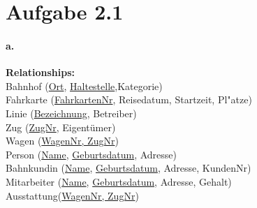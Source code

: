 \documentclass[12pt]{article}
\begin{document}
 	
 	
 	
 	
 	\section*{Aufgabe 2.1}
 	
 	
 	
 	\paragraph*{a.}
 		\textbf{Relationships:}\\
 		
	 	Bahnhof (\underline{Ort}, \underline{Haltestelle},Kategorie)\\[1.3em]
	 	
	 	Fahrkarte (\underline{FahrkartenNr}, Reisedatum, Startzeit, Pl"atze)\\[1.3em]
	 	
	 	Linie (\underline{Bezeichnung}, Betreiber)\\[1.3em]
	 	
	 	Zug (\underline{ZugNr}, Eigentümer)\\[1.3em]
	 	
	 	Wagen (\underline{WagenNr, ZugNr})\\[1.3em]
	 	
	 	Person (\underline{Name}, \underline{Geburtsdatum}, Adresse) \\[1.2em]
	 	
	 	Bahnkundin (\underline{Name}, \underline{Geburtsdatum}, Adresse, KundenNr)\\[1.2em]
	 	
	 	Mitarbeiter (\underline{Name}, \underline{Geburtsdatum},  Adresse, Gehalt)\\[1.2em]
	 	
	 	Ausstattung(\underline{WagenNr, ZugNr})\\[1.2em]
	 	
\end{document}

